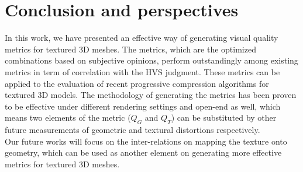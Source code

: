 \section{Conclusion and perspectives}
In this work, we have presented an effective way of generating visual quality metrics for textured 3D meshes. The metrics, which are the optimized combinations based on subjective opinions, perform outstandingly among existing metrics in term of correlation with the HVS judgment.  These metrics can be applied to the evaluation of recent progressive compression algorithms for textured 3D models. The methodology of generating the metrics has been proven to be effective under different rendering settings and open-end as well, which means two elements of the metric ($Q_G$ and $Q_T$) can be substituted by other future measurements of geometric and textural distortions respectively.  \\
Our future works will focus on the inter-relations on mapping the texture onto geometry, which can be used as another element on generating more effective metrics for textured 3D meshes.\textit{}\textbf{}